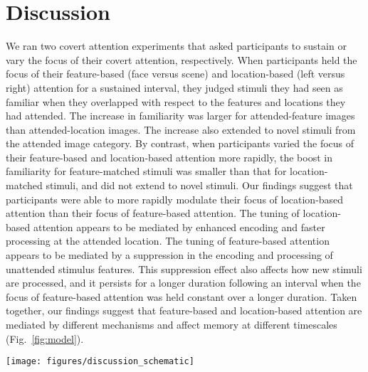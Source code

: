 \documentclass[english]{article}
\begin{document}
\section*{Discussion}
We ran two covert attention experiments that asked participants to sustain or vary the focus of their covert attention, respectively.  When participants held the focus of their feature-based (face versus scene) and location-based (left versus right) attention for a sustained interval, they judged stimuli they had seen as familiar when they overlapped with respect to the features and locations they had attended.  The increase in familiarity was larger for attended-feature images than attended-location images.  The increase also extended to novel stimuli from the attended image category.  By contrast, when participants varied the focus of their feature-based and location-based attention more rapidly, the boost in familiarity for feature-matched stimuli was smaller than that for location-matched stimuli, and did not extend to novel stimuli.  Our findings suggest that participants were able to more rapidly modulate their focus of location-based attention than their focus of feature-based attention.  The tuning of location-based attention appears to be mediated by enhanced encoding and faster processing at the attended location.  The tuning of feature-based attention appears to be mediated by a suppression in the encoding and processing of unattended stimulus features.  This suppression effect also affects how new stimuli are processed, and it persists for a longer duration following an interval when the focus of feature-based attention was held constant over a longer duration.  Taken together, our findings suggest that feature-based and location-based attention are mediated by different mechanisms and affect memory at different timescales (Fig.~\ref{fig:model}).

\begin{figure*}[tp]
  \centering \texttt{[image: figures/discussion\_schematic]}
  \caption{\textbf{Timecourse of encoding and retrieval effects of feature-based and location-based attention.}  The focus of location-based attention (green) may be modulated quickly and rapidly enhances memory encoding for nearby stimuli.  The focus of feature-based attention (purple) is modulated more slowly, and serves to suppress unattended stimulus features.  The effects of location-based attention on memory persist for longer than the effects of feature-based attention.  Sustained attention (darker shading) yields more robust enhancement and suppression than shorter-term (variable) attention (light shading).  The vertical gray line on the left denotes the duration of a single stimulus presentation (the upper bound by which location-based attention begins to affect encoding, and the lower-bound by which feature-based attention begins to affect encoding).  The vertical gray line on the right separates encoding from immediate subsequent retrieval of the encoded information.}
\label{fig:model}
\end{figure*}
\end{document}

